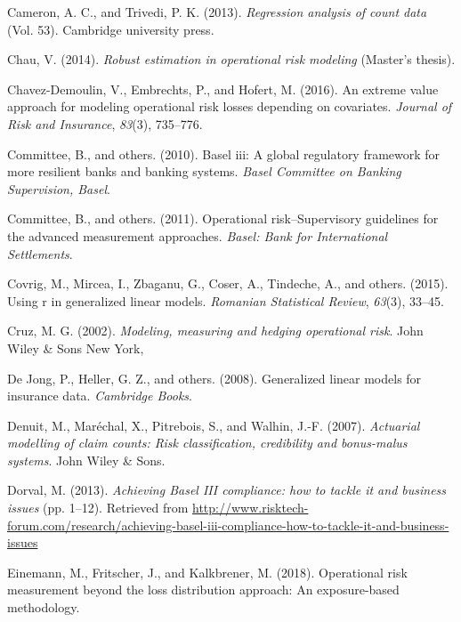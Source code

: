 \documentclass[]{DissertateUSU}
\begin{document}
\hypertarget{ref-cameron2013regression}{}
Cameron, A. C., and Trivedi, P. K. (2013). \emph{Regression analysis of
count data} (Vol. 53). Cambridge university press.

\hypertarget{ref-chau2014robust}{}
Chau, V. (2014). \emph{Robust estimation in operational risk modeling}
(Master's thesis).

\hypertarget{ref-chavez2016extreme}{}
Chavez-Demoulin, V., Embrechts, P., and Hofert, M. (2016). An extreme
value approach for modeling operational risk losses depending on
covariates. \emph{Journal of Risk and Insurance}, \emph{83}(3),
735--776.

\hypertarget{ref-basel2010basel}{}
Committee, B., and others. (2010). Basel iii: A global regulatory
framework for more resilient banks and banking systems. \emph{Basel
Committee on Banking Supervision, Basel}.

\hypertarget{ref-basel2011operational}{}
Committee, B., and others. (2011). Operational risk--Supervisory
guidelines for the advanced measurement approaches. \emph{Basel: Bank
for International Settlements}.

\hypertarget{ref-covrig2015using}{}
Covrig, M., Mircea, I., Zbaganu, G., Coser, A., Tindeche, A., and
others. (2015). Using r in generalized linear models. \emph{Romanian
Statistical Review}, \emph{63}(3), 33--45.

\hypertarget{ref-cruz2002modeling}{}
Cruz, M. G. (2002). \emph{Modeling, measuring and hedging operational
risk}. John Wiley \& Sons New York,

\hypertarget{ref-de2008generalized}{}
De Jong, P., Heller, G. Z., and others. (2008). Generalized linear
models for insurance data. \emph{Cambridge Books}.

\hypertarget{ref-denuit2007actuarial}{}
Denuit, M., Maréchal, X., Pitrebois, S., and Walhin, J.-F. (2007).
\emph{Actuarial modelling of claim counts: Risk classification,
credibility and bonus-malus systems}. John Wiley \& Sons.

\hypertarget{ref-mysis2013}{}
Dorval, M. (2013). \emph{Achieving Basel III compliance: how to tackle
it and business issues} (pp. 1--12). Retrieved from
\url{http://www.risktech-forum.com/research/achieving-basel-iii-compliance-how-to-tackle-it-and-business-issues}

\hypertarget{ref-einemann2018operational}{}
Einemann, M., Fritscher, J., and Kalkbrener, M. (2018). Operational risk
measurement beyond the loss distribution approach: An exposure-based
methodology.
\end{document}
